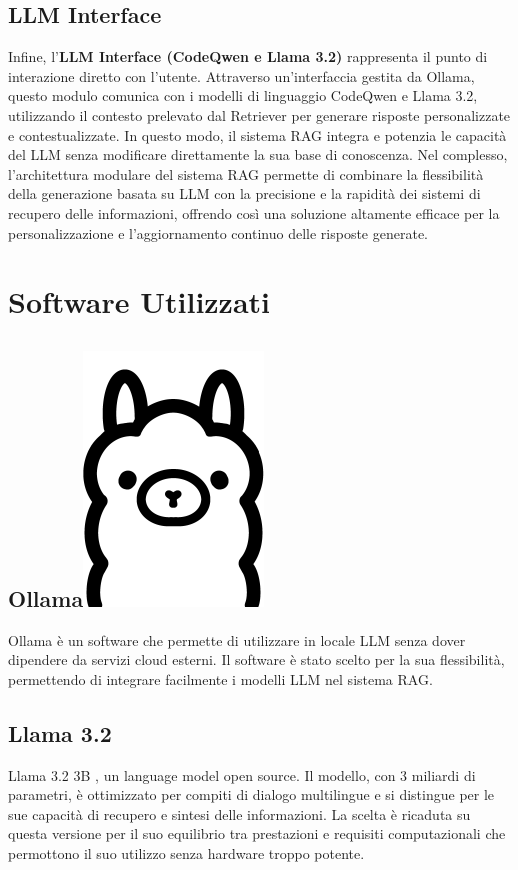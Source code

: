 \documentclass[12pt,a4paper,openright,twoside]{book}
\begin{document}
\subsection{LLM Interface}
Infine, l'\textbf{LLM Interface (CodeQwen e Llama 3.2)} rappresenta il punto di interazione diretto con l'utente. Attraverso un'interfaccia gestita da Ollama, questo modulo comunica con i modelli di linguaggio CodeQwen e Llama 3.2, utilizzando il contesto prelevato dal Retriever per generare risposte personalizzate e contestualizzate. In questo modo, il sistema RAG integra e potenzia le capacità del LLM senza modificare direttamente la sua base di conoscenza.
Nel complesso, l'architettura modulare del sistema RAG permette di combinare la flessibilità della generazione basata su LLM con la precisione e la rapidità dei sistemi di recupero delle informazioni, offrendo così una soluzione altamente efficace per la personalizzazione e l'aggiornamento continuo delle risposte generate.

\section{Software Utilizzati}
\subsection{Ollama\hspace{0.3cm}\protect\includegraphics[width=0.03\linewidth]{figures/ollama.png}}
Ollama \cite{ollama-docs} è un software che permette di utilizzare in locale LLM
senza dover dipendere da servizi cloud esterni.
Il software è stato scelto per la sua flessibilità, permettendo di integrare facilmente i modelli LLM nel sistema RAG.

\subsection{Llama 3.2}
Llama 3.2 3B \cite{llama3-2}, un language model open source.
Il modello, con 3 miliardi di parametri, è ottimizzato per compiti di dialogo multilingue e si distingue per le sue capacità di recupero e sintesi delle informazioni.
La scelta è ricaduta su questa versione per il suo equilibrio tra prestazioni e requisiti computazionali che permottono il suo utilizzo senza hardware troppo potente.
\end{document}
